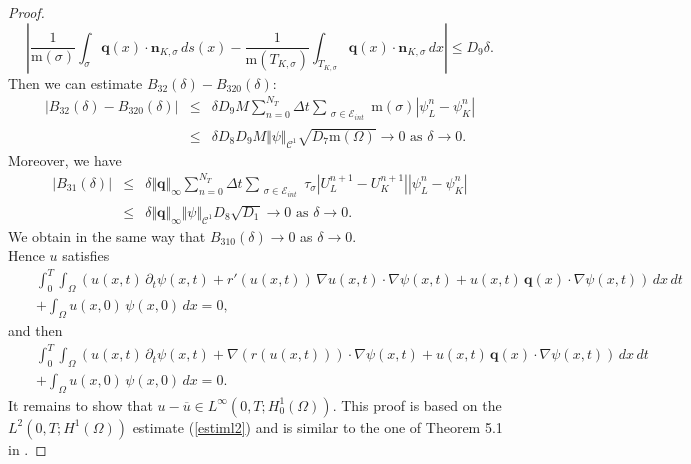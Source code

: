 \documentclass[smallextended]{svjour3}
\def\pa{\partial}
\def\pa{\partial}
\begin{document}
\begin{proof}
\begin{equation*}
\left| \frac{1}{\text{m}(\sigma)}\int_{\sigma}\textbf{q}(x)\cdot \textbf{n}_{K,\sigma} \, ds(x)-\frac{1}{\text{m}(T_{K,\sigma})}\int_{T_{K,\sigma}}\textbf{q}(x)\cdot \textbf{n}_{K,\sigma} \, dx\right| \leq D_{9} \delta.
\end{equation*}
Then we can estimate $B_{32}(\delta)-B_{320}(\delta)$:
\begin{eqnarray*}
\left| B_{32}(\delta)-B_{320}(\delta)\right| &\leq & \delta D_{9} M \sum_{n=0}^{N_{T}}\Delta t\sum_{\substack{\sigma \in \mathcal{E}_{int}}}\text{m}(\sigma) \left|\psi_{L}^{n}-\psi_{K}^{n}\right|\\
& \leq & \delta D_{8} D_{9} M \Vert \psi \Vert_{\mathcal{C}^{1}}\sqrt{D_{7}\text{m}(\Omega)} \longrightarrow 0 \text{ as } \delta \rightarrow 0.
\end{eqnarray*}
Moreover, we have
\begin{eqnarray*}
\left|B_{31}(\delta)\right| & \leq & \delta \Vert \textbf{q} \Vert_{\infty} \sum_{n=0}^{N_{T}}\Delta t\sum_{\substack{\sigma \in \mathcal{E}_{int}}}\tau_{\sigma}\left|U_{L}^{n+1}-U_{K}^{n+1}\right| \left|\psi_{L}^{n}-\psi_{K}^{n}\right|\\
& \leq & \delta \Vert \textbf{q} \Vert_{\infty} \Vert \psi \Vert_{\mathcal{C}^{1}}D_{8}\sqrt{D_{1}} \longrightarrow 0 \text{ as } \delta \rightarrow 0.
\end{eqnarray*}
We obtain in the same way that $B_{310}(\delta) \longrightarrow 0$ as $\delta \rightarrow 0$.\\

Hence $u$ satisfies
\begin{eqnarray*}
& & \int_{0}^{T}\int_{\Omega}\left(u(x,t)\, \pa_{t}\psi(x,t)+r'(u(x,t))\, \nabla u(x,t)\cdot \nabla\psi(x,t)+u(x,t)\, \mathbf{q}(x)\cdot \nabla\psi(x,t)\right)\, dx \, dt\\
& &+\int_{\Omega}u(x,0)\, \psi(x,0)\, dx=0,
\end{eqnarray*}
and then 
\begin{eqnarray*}
& & \int_{0}^{T}\int_{\Omega}\left(u(x,t)\, \pa_{t}\psi(x,t)+\nabla(r(u(x,t)))\cdot \nabla\psi(x,t)+u(x,t)\, \mathbf{q}(x)\cdot \nabla\psi(x,t)\right)\, dx \, dt\\
& &+\int_{\Omega}u(x,0)\, \psi(x,0)\, dx=0.
\end{eqnarray*}
It remains to show that $u-\overline{u} \in L^{\infty}(0,T;H^{1}_{0}(\Omega))$. This proof is based on the $L^{2}(0,T;H^{1}(\Omega))$ estimate (\ref{estiml2}) and is similar to the one of Theorem 5.1 in \cite{Chainais-Hillairet2003}.

\end{proof}
\end{document}
